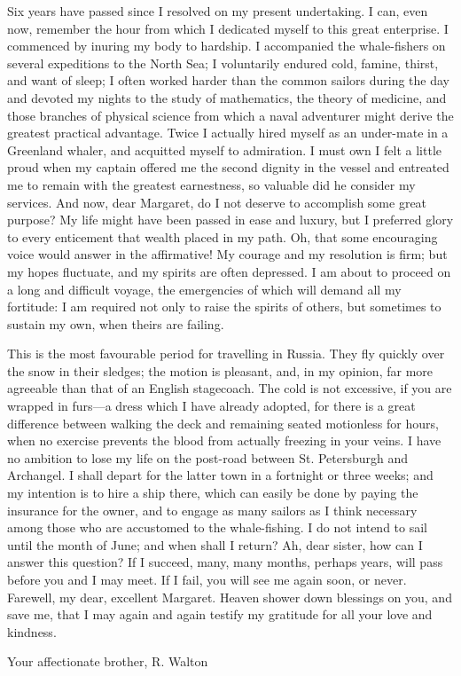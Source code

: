 Six years have passed since I resolved on my present undertaking. I can, even now, remember the hour from which I dedicated myself to this great enterprise. I commenced by inuring my body to hardship. I accompanied the whale-fishers on several expeditions to the North Sea; I voluntarily endured cold, famine, thirst, and want of sleep; I often worked harder than the common sailors during the day and devoted my nights to the study of mathematics, the theory of medicine, and those branches of physical science from which a naval adventurer might derive the greatest practical advantage. Twice I actually hired myself as an under-mate in a Greenland whaler, and acquitted myself to admiration. I must own I felt a little proud when my captain offered me the second dignity in the vessel and entreated me to remain with the greatest earnestness, so valuable did he consider my services. And now, dear Margaret, do I not deserve to accomplish some great purpose? My life might have been passed in ease and luxury, but I preferred glory to every enticement that wealth placed in my path. Oh, that some encouraging voice would answer in the affirmative! My courage and my resolution is firm; but my hopes fluctuate, and my spirits are often depressed. I am about to proceed on a long and difficult voyage, the emergencies of which will demand all my fortitude: I am required not only to raise the spirits of others, but sometimes to sustain my own, when theirs are failing.

This is the most favourable period for travelling in Russia. They fly quickly over the snow in their sledges; the motion is pleasant, and, in my opinion, far more agreeable than that of an English stagecoach. The cold is not excessive, if you are wrapped in furs---a dress which I have already adopted, for there is a great difference between walking the deck and remaining seated motionless for hours, when no exercise prevents the blood from actually freezing in your veins. I have no ambition to lose my life on the post-road between St. Petersburgh and Archangel. I shall depart for the latter town in a fortnight or three weeks; and my intention is to hire a ship there, which can easily be done by paying the insurance for the owner, and to engage as many sailors as I think necessary among those who are accustomed to the whale-fishing. I do not intend to sail until the month of June; and when shall I return? Ah, dear sister, how can I answer this question? If I succeed, many, many months, perhaps years, will pass before you and I may meet. If I fail, you will see me again soon, or never. Farewell, my dear, excellent Margaret. Heaven shower down blessings on you, and save me, that I may again and again testify my gratitude for all your love and kindness.

Your affectionate brother,     R. Walton